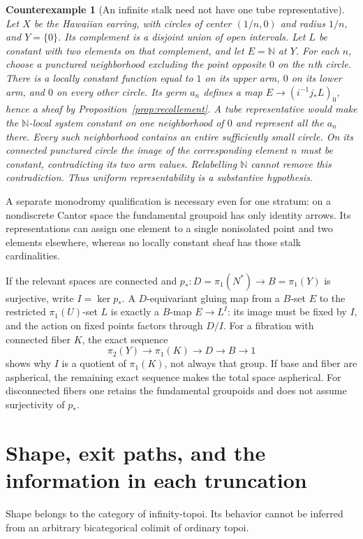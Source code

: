 \documentclass[11pt,a4paper]{article}
\newtheorem{counterexample}[theorem]{Counterexample}
\theoremstyle{definition}
\begin{document}
\begin{counterexample}[An infinite stalk need not have one tube representative]\label{ex:earring}
Let $X$ be the Hawaiian earring, with circles of center $(1/n,0)$
and radius $1/n$, and $Y=\{0\}$. Its complement is a disjoint union
of open intervals. Let $L$ be constant with two elements on that
complement, and let $E=\mathbb N$ at $Y$. For each $n$, choose a
punctured neighborhood excluding the point opposite $0$ on the
$n$th circle. There is a locally constant function equal to $1$ on
its upper arm, $0$ on its lower arm, and $0$ on every other circle.
Its germ $a_n$ defines a map $E\to(i^{-1}j_*L)_0$, hence a sheaf by
Proposition~\ref{prop:recollement}.
A tube representative would make the $\mathbb N$-local system
constant on one neighborhood of $0$ and represent all the $a_n$
there. Every such neighborhood contains an entire sufficiently
small circle. On its connected punctured circle the image of the
corresponding element $n$ must be constant, contradicting its two
arm values. Relabelling $\mathbb N$ cannot remove this contradiction.
Thus uniform representability is a substantive hypothesis.
\end{counterexample}
A separate monodromy qualification is necessary even for one stratum:
on a nondiscrete Cantor space the fundamental groupoid has only
identity arrows. Its representations can assign one element to a
single nonisolated point and two elements elsewhere, whereas no
locally constant sheaf has those stalk cardinalities.

If the relevant spaces are connected and $p_*:D=\pi_1(N^*)\to
B=\pi_1(Y)$ is surjective, write $I=\ker p_*$. A $D$-equivariant
gluing map from a $B$-set $E$ to the restricted $\pi_1(U)$-set $L$
is exactly a $B$-map $E\to L^I$: its image must be fixed by $I$,
and the action on fixed points factors through $D/I$. For a fibration
with connected fiber $K$, the exact sequence
\[
 \pi_2(Y)\longrightarrow\pi_1(K)\longrightarrow D
 \longrightarrow B\longrightarrow1
\]
shows why $I$ is a quotient of $\pi_1(K)$, not always that group.
If base and fiber are aspherical, the remaining exact sequence makes
the total space aspherical. For disconnected fibers one retains the
fundamental groupoids and does not assume surjectivity of $p_*$.

\section{Shape, exit paths, and the information in each truncation}\label{sec:shape-exit}
Shape belongs to the category of infinity-topoi. Its behavior cannot
be inferred from an arbitrary bicategorical colimit of ordinary topoi.
\end{document}
